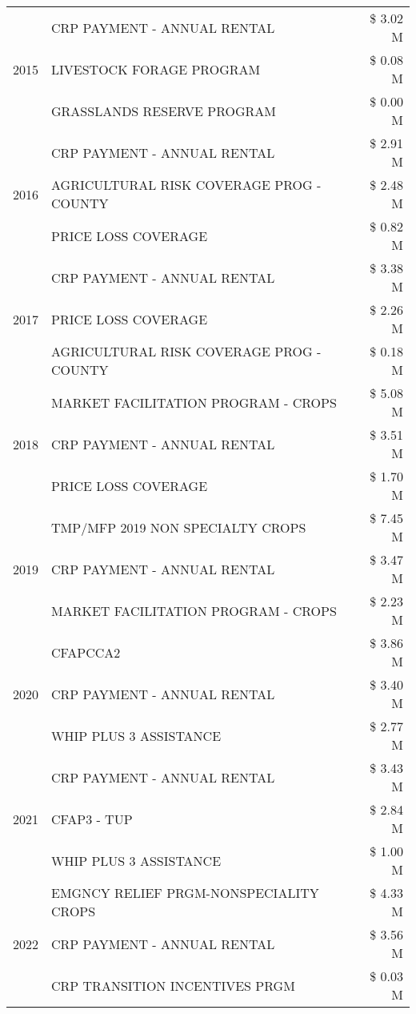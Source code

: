 \begin{tabular}{llr}
\multirow[t]{3}{*}{2015} & CRP PAYMENT - ANNUAL RENTAL & \$ 3.02 M \\
 & LIVESTOCK FORAGE PROGRAM & \$ 0.08 M \\
 & GRASSLANDS RESERVE PROGRAM & \$ 0.00 M \\
\cline{1-3}
\multirow[t]{3}{*}{2016} & CRP PAYMENT - ANNUAL RENTAL & \$ 2.91 M \\
 & AGRICULTURAL RISK COVERAGE PROG - COUNTY & \$ 2.48 M \\
 & PRICE LOSS COVERAGE & \$ 0.82 M \\
\cline{1-3}
\multirow[t]{3}{*}{2017} & CRP PAYMENT - ANNUAL RENTAL & \$ 3.38 M \\
 & PRICE LOSS COVERAGE & \$ 2.26 M \\
 & AGRICULTURAL RISK COVERAGE PROG - COUNTY & \$ 0.18 M \\
\cline{1-3}
\multirow[t]{3}{*}{2018} & MARKET FACILITATION PROGRAM - CROPS & \$ 5.08 M \\
 & CRP PAYMENT - ANNUAL RENTAL & \$ 3.51 M \\
 & PRICE LOSS COVERAGE & \$ 1.70 M \\
\cline{1-3}
\multirow[t]{3}{*}{2019} & TMP/MFP 2019 NON SPECIALTY CROPS & \$ 7.45 M \\
 & CRP PAYMENT - ANNUAL RENTAL & \$ 3.47 M \\
 & MARKET FACILITATION PROGRAM - CROPS & \$ 2.23 M \\
\cline{1-3}
\multirow[t]{3}{*}{2020} & CFAPCCA2 & \$ 3.86 M \\
 & CRP PAYMENT - ANNUAL RENTAL & \$ 3.40 M \\
 & WHIP PLUS 3 ASSISTANCE & \$ 2.77 M \\
\cline{1-3}
\multirow[t]{3}{*}{2021} & CRP PAYMENT - ANNUAL RENTAL & \$ 3.43 M \\
 & CFAP3 - TUP & \$ 2.84 M \\
 & WHIP PLUS 3 ASSISTANCE & \$ 1.00 M \\
\cline{1-3}
\multirow[t]{3}{*}{2022} & EMGNCY RELIEF PRGM-NONSPECIALITY CROPS & \$ 4.33 M \\
 & CRP PAYMENT - ANNUAL RENTAL & \$ 3.56 M \\
 & CRP TRANSITION INCENTIVES PRGM & \$ 0.03 M \\
\cline{1-3}
\bottomrule
\end{tabular}
